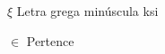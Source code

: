 
\begin{simbolos}
  \item[$ \xi $] Letra grega minúscula ksi
  \item[$ \in $] Pertence
\end{simbolos}
